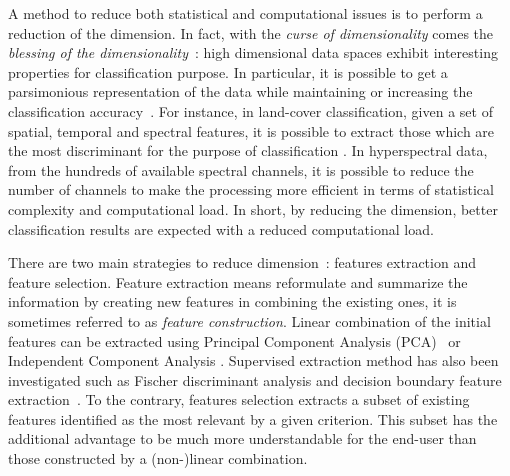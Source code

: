 \documentclass[journal,10pt]{IEEEtran}
\begin{document}
A method  to reduce  both statistical and  computational issues  is to
perform a reduction of the dimension. In fact, with the \emph{curse of
  dimensionality}     comes     the      \emph{blessing     of     the
  dimensionality}~\cite{bouveyron2014model}:  high   dimensional  data
spaces   exhibit  interesting   properties   for    classification
purpose.  In  particular,  it  is   possible  to  get  a  parsimonious
representation  of  the  data  while  maintaining  or  increasing  the
classification  accuracy~\cite{jimenez1998supervised}.  For  instance,
in land-cover  classification, given  a set  of spatial,  temporal and
spectral features, it is possible to  extract those which are the most
discriminant      for      the     purpose      of      classification
\cite{fassnacht2014comparison}.   In  hyperspectral   data,  from  the
hundreds of available spectral channels,  it is possible to reduce the
number of channels  to make the processing more efficient  in terms of
statistical complexity  and computational load. In  short, by reducing
the dimension, better classification results are expected with a reduced
computational load.



There  are  two  main  strategies  to  reduce  dimension~\cite[Chapter
1]{Guyon:2006:FEF:1208773}: features extraction and feature selection.
Feature extraction means reformulate  and summarize the information by
creating new features in combining  the existing ones, it is sometimes
referred to as \emph{feature construction}.  Linear combination of the
initial features  can be extracted using  Principal Component Analysis
(PCA)~\cite{jimenez1998supervised}  or Independent  Component Analysis
\cite{villa2011hyperspectral}.  Supervised extraction  method has also
been investigated  such as Fischer discriminant  analysis and decision
boundary feature  extraction~\cite{book:landgrebe}.  To  the contrary,
features selection  extracts a subset of  existing features identified
as  the most  relevant  by a  given criterion.   This  subset has  the
additional advantage to  be much more understandable  for the end-user
than those constructed by a (non-)linear combination.
\end{document}

